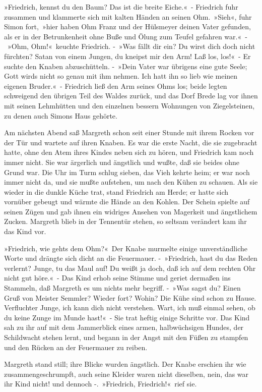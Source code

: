 »Friedrich, kennst du den Baum? Das ist die breite Eiche.« - Friedrich fuhr zusammen und klammerte sich mit kalten Händen an seinen Ohm. »Sieh«, fuhr Simon fort, »hier haben Ohm Franz und der Hülsmeyer deinen Vater gefunden, als er in der Betrunkenheit ohne Buße und Ölung zum Teufel gefahren war.« - »Ohm, Ohm!« keuchte Friedrich. - »Was fällt dir ein? Du wirst dich doch nicht fürchten? Satan von einem Jungen, du kneipst mir den Arm! Laß los, los!« - Er suchte den Knaben abzuschütteln. - »Dein Vater war übrigens eine gute Seele; Gott wirds nicht so genau mit ihm nehmen. Ich hatt ihn so lieb wie meinen eigenen Bruder.« - Friedrich ließ den Arm seines Ohms los; beide legten schweigend den übrigen Teil des Waldes zurück, und das Dorf Brede lag vor ihnen mit seinen Lehmhütten und den einzelnen bessern Wohnungen von Ziegelsteinen, zu denen auch Simons Haus gehörte.

Am nächsten Abend saß Margreth schon seit einer Stunde mit ihrem Rocken vor der Tür und wartete auf ihren Knaben. Es war die erste Nacht, die sie zugebracht hatte, ohne den Atem ihres Kindes neben sich zu hören, und Friedrich kam noch immer nicht. Sie war ärgerlich und ängstlich und wußte, daß sie beides ohne Grund war. Die Uhr im Turm schlug sieben, das Vieh kehrte heim; er war noch immer nicht da, und sie mußte aufstehen, um nach den Kühen zu schauen. Als sie wieder in die dunkle Küche trat, stand Friedrich am Herde; er hatte sich vornüber gebeugt und wärmte die Hände an den Kohlen. Der Schein spielte auf seinen Zügen und gab ihnen ein widriges Ansehen von Magerkeit und ängstlichem Zucken. Margreth blieb in der Tennentür stehen, so seltsam verändert kam ihr das Kind vor.

»Friedrich, wie gehts dem Ohm?« Der Knabe murmelte einige unverständliche Worte und drängte sich dicht an die Feuermauer. - »Friedrich, hast du das Reden verlernt? Junge, tu das Maul auf! Du weißt ja doch, daß ich auf dem rechten Ohr nicht gut höre.« - Das Kind erhob seine Stimme und geriet dermaßen ins Stammeln, daß Margreth es um nichts mehr begriff. - »Was sagst du? Einen Gruß von Meister Semmler? Wieder fort? Wohin? Die Kühe sind schon zu Hause. Verfluchter Junge, ich kann dich nicht verstehen. Wart, ich muß einmal sehen, ob du keine Zunge im Munde hast!« - Sie trat heftig einige Schritte vor. Das Kind sah zu ihr auf mit dem Jammerblick eines armen, halbwüchsigen Hundes, der Schildwacht stehen lernt, und begann in der Angst mit den Füßen zu stampfen und den Rücken an der Feuermauer zu reiben.

Margreth stand still; ihre Blicke wurden ängstlich. Der Knabe erschien ihr wie zusammengeschrumpft, auch seine Kleider waren nicht dieselben, nein, das war ihr Kind nicht! und dennoch -. »Friedrich, Friedrich!« rief sie.

